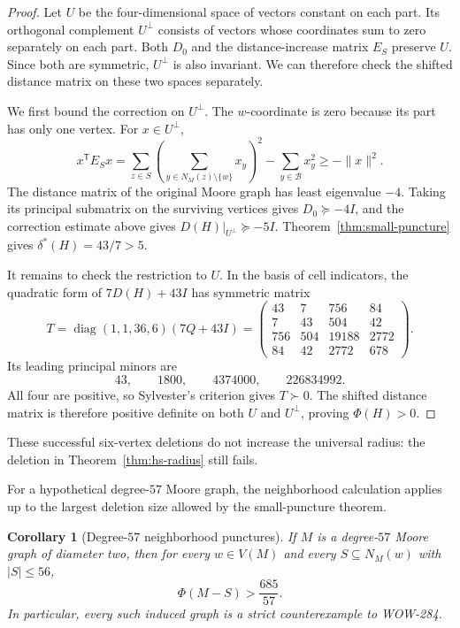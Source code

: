 \documentclass[a4paper,10pt,reqno]{amsart}
\theoremstyle{plain}
\newtheorem{corollary}[theorem]{Corollary}
\theoremstyle{definition}
\theoremstyle{remark}
\begin{document}
\begin{proof}
Let \(U\) be the four-dimensional space of vectors constant on each part.
Its orthogonal complement \(U^\perp\) consists of vectors whose coordinates
sum to zero separately on each part. Both \(D_0\) and the distance-increase
matrix \(E_S\) preserve \(U\). Since both are symmetric, \(U^\perp\) is
also invariant. We can therefore check the shifted distance matrix
on these two spaces separately.

We first bound the correction on \(U^\perp\). The \(w\)-coordinate is zero
because its part has only one vertex. For \(x\in U^\perp\),
\[
 x^{\mathsf T}E_Sx
 =\sum_{z\in S}\left(\sum_{y\in N_M(z)\setminus\{w\}}x_y\right)^2
   -\sum_{y\in\mathcal B}x_y^2
 \ge-\lVert x\rVert^2.
\]
The distance matrix of the original Moore graph has least eigenvalue \(-4\).
Taking its principal submatrix on the surviving vertices gives
\(D_0\succeq-4I\), and the correction estimate above gives
\(D(H)|_{U^\perp}\succeq-5I\).
Theorem~\ref{thm:small-puncture} gives
\(\delta^*(H)=43/7>5\).

It remains to check the restriction to \(U\).  In the basis of cell
indicators, the quadratic form of \(7D(H)+43I\) has symmetric matrix
\[
 T=\operatorname{diag}(1,1,36,6)(7Q+43I)
 =\begin{pmatrix}
 43&7&756&84\\
 7&43&504&42\\
 756&504&19188&2772\\
 84&42&2772&678
 \end{pmatrix}.
\]
Its leading principal minors are
\[
 43,\qquad1800,\qquad4374000,\qquad226834992.
\]
All four are positive, so Sylvester's criterion gives
\(T\succ0\).  The shifted distance matrix is therefore positive
definite on both \(U\) and \(U^\perp\), proving \(\Phi(H)>0\).
\end{proof}

These successful six-vertex deletions do not increase the universal radius:
the deletion in Theorem~\ref{thm:hs-radius} still fails.

For a hypothetical degree-\(57\) Moore graph, the neighborhood
calculation applies up to the largest deletion size allowed by the
small-puncture theorem.

\begin{corollary}[Degree-\(57\) neighborhood punctures]
\label{cor:degree57-neighborhood}
If \(M\) is a degree-\(57\) Moore graph of diameter two, then for every
\(w\in V(M)\) and every \(S\subseteq N_M(w)\) with \(|S|\le56\),
\[
 \Phi(M-S)>\frac{685}{57}.
\]
In particular, every such induced graph is a strict counterexample to
WOW-284.
\end{corollary}
\end{document}

